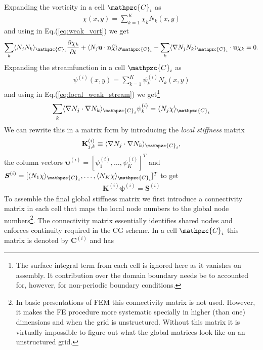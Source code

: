 \documentclass[11pt, reqno]{amsart}
\newcommand{\eqr}[1]{Eq.\thinspace(#1)}
\newcommand{\pfrac}[2]{\frac{\partial #1}{\partial #2}}
\newcommand{\mvec}[1]{\mathbf{#1}}
\newcommand{\gvec}[1]{\boldsymbol{#1}}
\newcommand{\script}[1]{\mathpzc{#1}}
\newcommand{\iprod}[2]{\langle{#1}\rangle_{#2}}
\theoremstyle{definition}
\begin{document}
Expanding the vorticity in a cell $\script{C}_i$ as
\begin{align}
  \chi(x,y) = \sum_{k=1}^K \chi_k N_k(x,y)
\end{align}
and using in \eqr{\ref{eq:weak_vort}} we get
\begin{align}
  \sum_{k} \iprod{N_jN_k}{\script{C}_i} \pfrac{\chi_k}{t}
  +
  \iprod{N_j\mvec{u}\cdot\mvec{n} \widehat{\chi}}{\partial \script{C}_i}
  -
  \sum_{k}\iprod{\nabla N_jN_k}{\script{C}_i}
  \cdot\mvec{u} \chi_k
  = 0. \label{eq:dg_vort}
\end{align}
Expanding the streamfunction in a cell $\script{C}_i$ as
\begin{align}
  \psi^{(i)}(x,y) = \sum_{k=1}^K \psi_k^{(i)} N_k(x,y)
\end{align}
and using in \eqr{\ref{eq:local_weak_stream}} we get\footnote{The
  surface integral term from each cell is ignored here as it vanishes
  on assembly. It contribution over the domain boundary needs be to
  accounted for, however, for non-periodic boundary conditions.}
\begin{align}
  \sum_k
  \iprod{\nabla N_j\cdot \nabla N_k}{\script{C}_i} \psi_k^{(i)}
  =
  \iprod{N_j\chi}{\script{C}_i}
\end{align}
We can rewrite this in a matrix form by introducing the \emph{local
  stiffness}  matrix
\begin{align}
  \mvec{K}^{(i)}_{j,k} \equiv \iprod{\nabla N_j\cdot \nabla N_k}{\script{C}_i},
\end{align}
the column vectors $\gvec{\psi}^{(i)} =
[\psi^{(i)}_1,\ldots,\psi^{(i)}_K]^T$ and $\gvec{S}^{(i)} =
[\iprod{N_1\chi}{\script{C}_i},\ldots,\iprod{N_K\chi}{\script{C}_i}]^T$
to get
\begin{align}
  \mvec{K}^{(i)}\gvec{\psi}^{(i)}
  =
  \mvec{S}^{(i)} \label{eq:local_cg_form}
\end{align}
To assemble the final global stiffness matrix we first introduce a
connectivity matrix in each cell that maps the local node numbers to
the global node numbers\footnote{In basic presentations of FEM this
  connectivity matrix is not used. However, it makes the FE procedure
  more systematic specially in higher (than one) dimensions and when
  the grid is unstructured. Without this matrix it is virtually
  impossible to figure out what the global matrices look like on an
  unstructured grid.}. The connectivity matrix essentially identifies
shared nodes and enforces continuity required in the CG scheme.  In a
cell $\script{C}_i$ this matrix is denoted by $\mvec{C}^{(i)}$ and has
\end{document}
